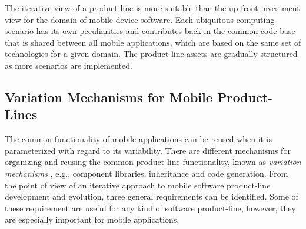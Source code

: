 The iterative view of a product-line is more suitable than the up-front investment view for the domain of mobile device software. Each ubiquitous computing scenario has its own peculiarities and contributes back in the common code base that is shared between all mobile applications, which are based on the same set of technologies for a given domain. The product-line assets are gradually structured as more scenarios are implemented.

\subsection{Variation Mechanisms for Mobile Product-Lines}
\label{sec:var.mob.pl}

The common functionality of mobile applications can be reused when it is parameterized with regard to its variability. There are different mechanisms for organizing and reusing the common product-line functionality, known as \textit{variation mechanisms} \cite{pl.00,harsu.2001}, e.g., component libraries, inheritance and code generation. From the point of view of an iterative approach to mobile software product-line development and evolution, three general requirements can be identified. Some of these requirement are useful for any kind of software product-line, however, they are especially important for mobile applications. 

